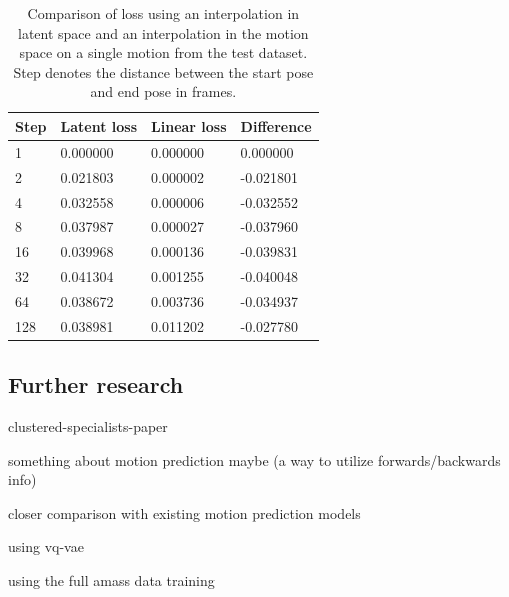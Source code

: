 \begin{table}[h]
\centering
\begin{tabular}{@{}llll@{}}
\toprule
Step & Latent loss & Linear loss & Difference  \\ \midrule
1    & 0.000000    & 0.000000    & 0.000000    \\
2    & 0.021803    & 0.000002    & -0.021801   \\
4    & 0.032558    & 0.000006    & -0.032552   \\
8    & 0.037987    & 0.000027    & -0.037960   \\
16   & 0.039968    & 0.000136    & -0.039831   \\
32   & 0.041304    & 0.001255    & -0.040048   \\
64   & 0.038672    & 0.003736    & -0.034937   \\
128  & 0.038981    & 0.011202    & -0.027780   \\ \bottomrule
\end{tabular}
\caption{Comparison of loss using an interpolation in latent space and an interpolation in the motion space on a single motion from the test dataset. Step denotes the distance between the start pose and end pose in frames.}
\label{tab:vae-eval}
\end{table}




\subsection{Further research}\label{subsec:further-research}
clustered-specialists-paper~\cite{won2020scalable}

something about motion prediction maybe (a way to utilize forwards/backwards info)

closer comparison with existing motion prediction models

using vq-vae

using the full amass data training
